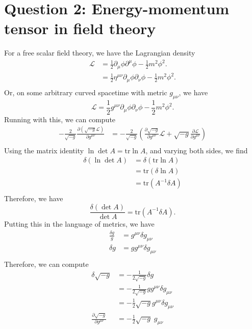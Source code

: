 \documentclass[12pt]{article}
\newcommand{\delmu}{\partial_{\mu}}
\newcommand{\delMu}{\partial^{\mu}}
\newcommand{\delnu}{\partial_{\nu}}
\newcommand{\+}{\dagger}
\begin{document}
\section*{Question 2: Energy-momentum tensor in field theory}
For a free scalar field theory, we have the Lagrangian density
\begin{align*}
    \mathcal{L} &= \frac{1}{2}\delmu\phi\delMu\phi - \frac{1}{2}m^2\phi^2.\\
    &= \frac{1}{2}\eta^{\mu\nu}\delmu\phi\delnu\phi - \frac{1}{2}m^2\phi^2.\\
\end{align*}
Or, on some arbitrary curved spacetime with metric $g_{\mu\nu}$, we have
\begin{equation*}
    \mathcal{L} = \frac{1}{2}g^{\mu\nu}\delmu\phi\delnu\phi - \frac{1}{2}m^2\phi^2.
\end{equation*}
Running with this, we can compute
\begin{align*}
    -\frac{2}{\sqrt{-g}}\frac{\partial(\sqrt{-g}\mathcal{L})}{\partial g^{\mu\nu}}
    &= -\frac{2}{\sqrt{-g}} \left( \frac{\partial\sqrt{-g}}{\partial g^{\mu\nu}}\mathcal{L} + \sqrt{-g}\frac{\partial\mathcal{L}}{\partial g^{\mu\nu}} \right)\\
\end{align*}
Using the matrix identity $\ln \det A = \text{tr} \ln A$, and varying both sides, we find
\begin{align*}
    \delta(\ln \det A) &= \delta(\text{tr} \ln A) \\
    &= \text{tr}(\delta \ln A) \\
    &= \text{tr} (A^{-1}\delta A) \\
\end{align*}
Therefore, we have
\begin{equation*}
    \frac{\delta(\det A)}{\det A} = \text{tr}(A^{-1}\delta A).
\end{equation*}
Putting this in the language of metrics, we have
\begin{align*}
    \frac{\delta g}{g} &= g^{\mu\nu}\delta g_{\mu\nu} \\
    \delta g &= g g^{\mu\nu}\delta g_{\mu\nu} \\
\end{align*}
Therefore, we can compute
\begin{align*}
    \delta \sqrt{-g} &= -\frac{1}{2\sqrt{-g}}\delta g \\
    &= -\frac{1}{2\sqrt{-g}} g g^{\mu\nu}\delta g_{\mu\nu} \\
    &= -\frac{1}{2}\sqrt{-g} g^{\mu\nu}\delta g_{\mu\nu} \\
    \frac{\partial \sqrt{-g}}{\partial g^{\mu\nu}} &= -\frac{1}{2}\sqrt{-g} \; g_{\mu\nu} \\
\end{align*}
\end{document}
